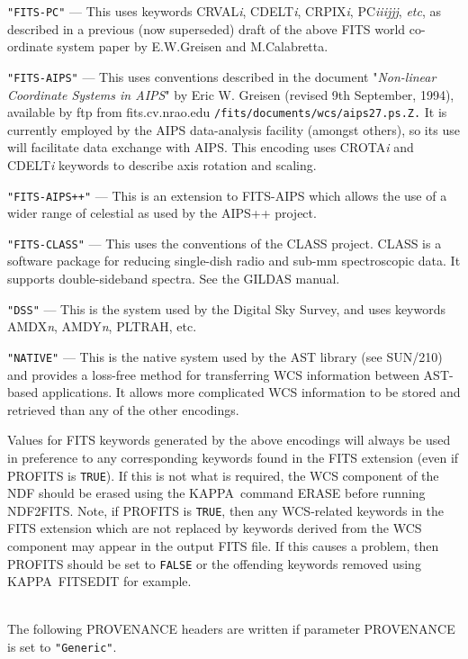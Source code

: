\documentclass[twoside,11pt]{article}
\newcommand{\htmladdnormallink}[2]{#1}
\newcommand{\xref}[3]{#1}
\newcommand{\KAPPA}{{\footnotesize KAPPA}}
\newcommand{\sstdiytopic}[2]{\goodbreak \item[{\hspace{-0.35em}#1\hspace{-0.35em}:}] \mbox{} \\[1.3ex] #2}
\newcommand{\ssthitemlist}[1]{
  \latexonly{
  \mbox{} \\
  \vspace{-3.5ex}
  }
  \begin{itemize}
     #1
  \end{itemize}
}
\newcommand{\sstitem}{\item}
\newcommand{\sstdiytopic}[2]{\\ \item[{#1}:]
      \begin{description}
         #2
      \end{description}
   }
\newcommand{\sstitem}{\item}
\begin{document}
{{{         \sstitem
         \texttt{"FITS-PC"} --- This uses keywords CRVAL\textit{i},
         CDELT\textit{i}, CRPIX\textit{i}, PC\textit{iiijjj}, 
         \textit{etc}, as described in a previous (now superseded) draft of
         the above FITS world co-ordinate system paper by E.W.Greisen and 
         M.Calabretta.

         \sstitem
         \texttt{"FITS-AIPS"} --- This uses conventions described in the
         document "\textit{Non-linear Coordinate Systems in AIPS}" by
         Eric W. Greisen (revised 9th September, 1994), available by ftp
         from fits.cv.nrao.edu \texttt{/fits/documents/wcs/aips27.ps.Z.}
         It is currently employed by the AIPS data-analysis facility
         (amongst others), so its use
         will facilitate data exchange with AIPS. This encoding uses
         CROTA\textit{i} and CDELT\textit{i} keywords to describe axis
         rotation and scaling.

         \sstitem 
         \texttt{"FITS-AIPS++"} --- This is an extension to FITS-AIPS which 
         allows the use of a wider range of celestial as used by the AIPS++ 
         project.

         \sstitem
         \texttt{"FITS-CLASS"} --- This uses the conventions of the CLASS
         project.  CLASS is a software package for reducing single-dish 
         radio and sub-mm spectroscopic data.  It supports double-sideband 
         spectra.  See \htmladdnormallink{the GILDAS 
         manual}{http://www.iram.fr/IRAMFR/GILDAS/doc/html/class-html/class.html}.

         \sstitem
         \texttt{"DSS"} --- This is the system used by the Digital Sky Survey, and
         uses keywords AMDX\textit{n}, AMDY\textit{n}, PLTRAH, etc.

         \sstitem
         \texttt{"NATIVE"} --- This is the native system used by the AST library (see
         SUN/210) and provides a loss-free method for transferring WCS
         information between AST-based applications.  It allows more
         complicated WCS information to be stored and retrieved than any of 
         the other encodings.
      }

      Values for FITS keywords generated by the above encodings will
      always be used in preference to any corresponding keywords found in
      the FITS extension (even if PROFITS is \texttt{TRUE}).
      If this is not what
      is required, the WCS component of the NDF should be erased using
      the \KAPPA\ command \xref{ERASE}{sun95}{ERASE} before running NDF2FITS. Note, if PROFITS
      is \texttt{TRUE}, then any WCS-related keywords in the FITS extension
      which are not replaced by keywords derived from the WCS component may
      appear in the output FITS file. If this causes a problem, then
      PROFITS should be set to \texttt{FALSE} or the offending keywords removed
      using \KAPPA\ 
      \xref{FITSEDIT}{sun95}{FITSEDIT}
      for example.
   }
   \sstdiytopic{
      \label{ndf2fits_provenance}Provenance
   }{
      The following PROVENANCE headers are written if parameter
      PROVENANCE is set to \texttt{"Generic"}.
      \ssthitemlist{

}}}
\end{document}
